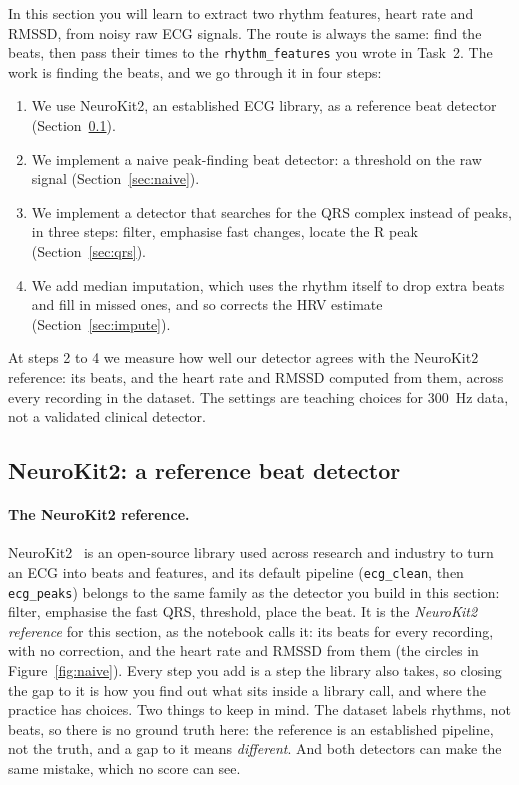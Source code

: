 \documentclass[12pt,article,oneside,linkcolour=blue]{oxengthesis}
\newcommand{\nb}[1]{\noindent{\small\textsf{Notebook: #1}}\par\nopagebreak\smallskip}
\begin{document}
In this section you will learn to extract two rhythm features,
heart rate and RMSSD, from noisy raw ECG signals. The route is always the same: find the beats,
then pass their times to the \texttt{rhythm\_features} you wrote in Task~2. The work is
finding the beats, and we go through it in four steps:
\begin{enumerate}[leftmargin=*, itemsep=2pt]
  \item We use NeuroKit2, an established ECG library, as a reference beat detector
        (Section~\ref{sec:reference}).
  \item We implement a naive peak-finding beat detector: a threshold on the raw signal
        (Section~\ref{sec:naive}).
  \item We implement a detector that searches for the QRS complex instead of peaks, in three
        steps: filter, emphasise fast changes, locate the R peak (Section~\ref{sec:qrs}).
  \item We add median imputation, which uses the rhythm itself to drop extra beats and fill in
        missed ones, and so corrects the HRV estimate (Section~\ref{sec:impute}).
\end{enumerate}
At steps 2 to 4 we measure how well our detector agrees with the NeuroKit2 reference: its beats,
and the heart rate and RMSSD computed from them, across every recording in the dataset. The
settings are teaching choices for \SI{300}{\hertz} data, not a validated clinical detector.



\subsection{NeuroKit2: a reference beat detector}
\label{sec:reference}
\nb{3.1}

\paragraph{The NeuroKit2 reference.} NeuroKit2~\cite{makowski2021neurokit2} is an open-source library
used across research and industry to turn an ECG into beats and features, and its default
pipeline (\texttt{ecg\_clean}, then \texttt{ecg\_peaks}) belongs to the same family as the
detector you build in this section: filter, emphasise the fast QRS, threshold, place the beat. It is the
\emph{NeuroKit2 reference} for this section, as the notebook calls it: its beats for
every recording, with no correction, and the heart rate and RMSSD from them (the circles in
Figure~\ref{fig:naive}). Every step you add is a step the library also takes, so closing the
gap to it is how you find out what sits inside a library call, and where the practice has
choices. Two things to keep in mind. The dataset labels rhythms, not beats, so there is no
ground truth here: the reference is an established pipeline, not the truth, and a gap to it
means \emph{different}. And both detectors can make the same mistake, which no score can see.
\end{document}
